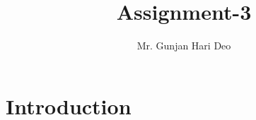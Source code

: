 \documentclass[12pt,a4paper]{article}
\author{Mr. Gunjan Hari Deo}
\title{Assignment-3}
\begin{document}
\maketitle
\section{Introduction}
\lipsum \cite{khallaf2021classification}
\lipsum[2]
\cite{november1996journals}
\lipsum[1]
\cite{chen2014big}
\lipsum[1]
\cite{zhu2018deep, warburton2003deep}
\lipsum[1]
\cite{jinbo2021high}
\lipsum[1]
\cite{feng2019deep,smys2020survey,saber2021novel}
\lipsum[1]
\cite{jacob2021design}


\end{document}
